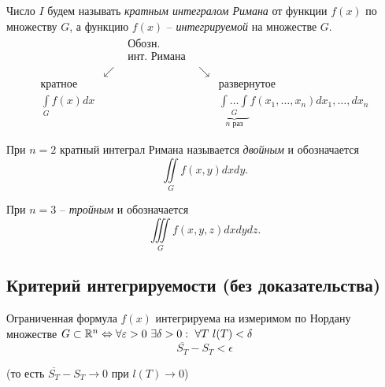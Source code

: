 \begin{note}
    Число $ I $ будем называть \emph{кратным интегралом Римана} от функции $ f(x) $ по множеству $ G $, а функцию $ f(x) $ -- \emph{интегрируемой} на множестве $ G $.
    \[
        \begin{array}{ccccc}
                                      &          & \begin{array}{cc}
                                                       \text{Обозн.} \\
                                                       \text{инт. Римана}
                                                   \end{array} &          &                                                                                                    \\
                                      & \swarrow &                    & \searrow &                                                                                             \\
            \text{кратное}            &          &                    &          & \text{развернутое}                                                                          \\
            \underset{G}{\int} f(x)dx &          &                    &          & \underbrace{\underset{G}{\int\ldots\int}}_{n \text{ раз}}f(x_1,\ldots,x_n)dx_1,\ldots,d x_n
        \end{array}
    \]

    При $ n=2 $ кратный интеграл Римана называется \emph{двойным} и обозначается
    \[
        \iint\limits_G f(x,y)dxdy.
    \]

    При $ n=3 $ -- \emph{тройным} и обозначается
    \[
        \iiint\limits_G f(x,y,z)dxdydz.
    \]
\end{note}

\newpage

\subsection{Критерий интегрируемости (без доказательства)}

\begin{theorem}
    Ограниченная формула $ f(x) $ интегрируема на измеримом по Нордану множестве $ G \subset \R^n \iff \forall \epsilon > 0 \ \exists\delta > 0: \ \forall T \ l(T)<\delta$
    \[
        \overline{S_T} - S_T < \epsilon
    \]
    \begin{center}
        (то есть $ \overline{S_T} - S_T \rightarrow 0 $ при $ l(T) \rightarrow 0 $)
    \end{center}
\end{theorem}

